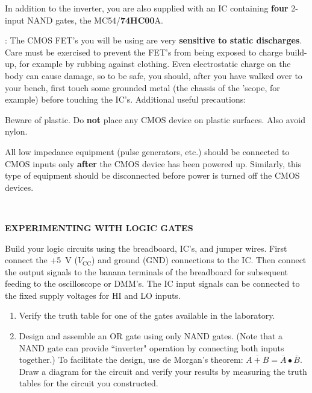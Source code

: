 \documentclass[12pt,oneside,openany,letterpaper]{article}
\newenvironment{packed_item}{
\begin{itemize}
  \setlength{\itemsep}{0pt}
  \setlength{\parskip}{0pt}
  \setlength{\parsep}{0pt}
}{\end{itemize}}
\begin{document}
\noindent In addition to the inverter, you are also supplied with an IC containing {\bf four} 2-input
NAND gates, the MC54/{\bf 74HC00}A.

\clearpage

: The CMOS FET’s you will be using are very {\bf sensitive to static discharges}.
Care must be exercised to prevent the FET’s from being exposed to charge build-up,
for example by rubbing against clothing. Even electrostatic charge on the body can cause
damage, so to be safe, you should, after you have walked over to your bench, first touch
some grounded metal (the chassis of the ’scope, for example) before touching the IC’s.
Additional useful precautions:
\begin{packed_item}
\item{Beware of plastic. Do {\bf not} place any CMOS device on plastic surfaces. Also avoid
nylon.}
\item{All low impedance equipment (pulse generators, etc.) should be connected to CMOS
inputs only {\bf after} the CMOS device has been powered up. Similarly, this type of
equipment should be disconnected before power is turned off the CMOS devices.}
\end{packed_item}

~

\begin{center}
{\Large{\bf EXPERIMENTING WITH LOGIC GATES}}
\end{center}

\noindent Build your logic circuits using the breadboard, IC’s, and jumper wires. First connect the +5~V ($V_\mathrm{CC}$) and
ground (GND) connections to the IC. Then connect the output signals to the banana
terminals of the breadboard for subsequent feeding to the oscilloscope or DMM’s. The
IC input signals can be connected to the fixed supply voltages for HI and LO inputs.
\begin{enumerate}[label={\bf\Alph*})]
\item{Verify the truth table for one of the gates available in the laboratory.}
\item{Design and assemble an OR gate using only NAND gates. (Note that a NAND gate
can provide ``inverter" operation by connecting both inputs together.) To facilitate the
design, use de Morgan’s theorem: $\overline{A + B} = \overline{A} \bullet \overline{B}$.
Draw a diagram for the circuit and verify your results by measuring the truth tables
for the circuit you constructed.}
\end{enumerate}
\end{document}
